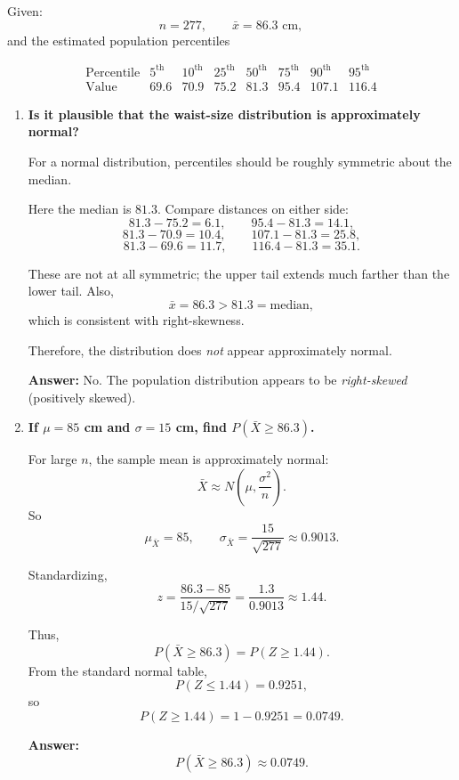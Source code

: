 \documentclass[11pt]{article}
\begin{document}
Given:
\[
n=277,\qquad \bar{x}=86.3\text{ cm},
\]
and the estimated population percentiles

\[
\begin{array}{c|ccccccc}
\text{Percentile} & 5^\text{th} & 10^\text{th} & 25^\text{th} & 50^\text{th} & 75^\text{th} & 90^\text{th} & 95^\text{th}\\
\hline
\text{Value} & 69.6 & 70.9 & 75.2 & 81.3 & 95.4 & 107.1 & 116.4
\end{array}
\]

\begin{enumerate}
    \item[(a)] \textbf{Is it plausible that the waist-size distribution is approximately normal?}

    For a normal distribution, percentiles should be roughly symmetric about the median.

    Here the median is $81.3$. Compare distances on either side:
    \[
    81.3-75.2=6.1,\qquad 95.4-81.3=14.1,
    \]
    \[
    81.3-70.9=10.4,\qquad 107.1-81.3=25.8,
    \]
    \[
    81.3-69.6=11.7,\qquad 116.4-81.3=35.1.
    \]

    These are not at all symmetric; the upper tail extends much farther than the lower tail. Also,
    \[
    \bar{x}=86.3 > 81.3=\text{median},
    \]
    which is consistent with right-skewness.

    Therefore, the distribution does \emph{not} appear approximately normal.

    \textbf{Answer:} No. The population distribution appears to be \emph{right-skewed} (positively skewed).

    \item[(b)] \textbf{If $\mu=85$ cm and $\sigma=15$ cm, find $P(\bar{X}\ge 86.3)$.}

    For large $n$, the sample mean is approximately normal:
    \[
    \bar{X}\approx N\left(\mu,\frac{\sigma^2}{n}\right).
    \]
    So
    \[
    \mu_{\bar{X}}=85,\qquad \sigma_{\bar{X}}=\frac{15}{\sqrt{277}}\approx 0.9013.
    \]

    Standardizing,
    \[
    z=\frac{86.3-85}{15/\sqrt{277}}
    =\frac{1.3}{0.9013}\approx 1.44.
    \]

    Thus,
    \[
    P(\bar{X}\ge 86.3)=P(Z\ge 1.44).
    \]
    From the standard normal table,
    \[
    P(Z\le 1.44)=0.9251,
    \]
    so
    \[
    P(Z\ge 1.44)=1-0.9251=0.0749.
    \]

    \textbf{Answer:}
    \[
    P(\bar{X}\ge 86.3)\approx 0.0749.
    \]


\end{enumerate}
\end{document}
